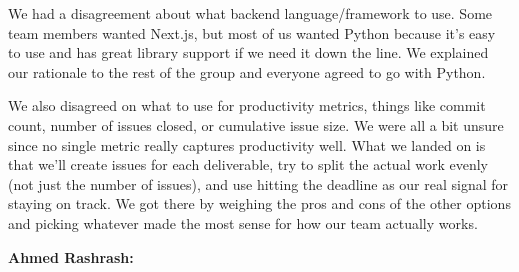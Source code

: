 \documentclass{article}
\begin{document}
\begin{enumerate}
          We had a disagreement about what backend language/framework to use.
          Some team members wanted Next.js, but most of us wanted Python
          because it's easy to use and has great library support if we need it
          down the line. We explained our rationale to the rest of the group
          and everyone agreed to go with Python.

          We also disagreed on what to use for productivity metrics, things
          like commit count, number of issues closed, or cumulative issue size.
          We were all a bit unsure since no single metric really captures
          productivity well. What we landed on is that we'll create issues for
          each deliverable, try to split the actual work evenly (not just the
          number of issues), and use hitting the deadline as our real signal
          for staying on track. We got there by weighing the pros and cons of
          the other options and picking whatever made the most sense for how
          our team actually works.

\end{enumerate}

\textbf{Ahmed Rashrash:}
\end{document}
